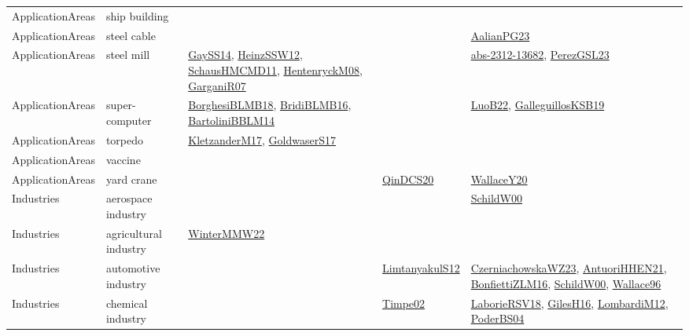{\begin{longtable}{lp{3cm}>{\raggedright}p{6cm}>{\raggedright}p{6cm}p{8cm}}
ApplicationAreas & ship building &  &  & \\
ApplicationAreas & steel cable &  &  & \href{papers/AalianPG23.pdf}{AalianPG23}\cite{AalianPG23}\\
ApplicationAreas & steel mill & \href{papers/GaySS14.pdf}{GaySS14}\cite{GaySS14}, \href{articles/HeinzSSW12.pdf}{HeinzSSW12}\cite{HeinzSSW12}, \href{articles/SchausHMCMD11.pdf}{SchausHMCMD11}\cite{SchausHMCMD11}, \href{papers/HentenryckM08.pdf}{HentenryckM08}\cite{HentenryckM08}, \href{papers/GarganiR07.pdf}{GarganiR07}\cite{GarganiR07} &  & \href{articles/abs-2312-13682.pdf}{abs-2312-13682}\cite{abs-2312-13682}, \href{papers/PerezGSL23.pdf}{PerezGSL23}\cite{PerezGSL23}\\
ApplicationAreas & super-computer & \href{articles/BorghesiBLMB18.pdf}{BorghesiBLMB18}\cite{BorghesiBLMB18}, \href{articles/BridiBLMB16.pdf}{BridiBLMB16}\cite{BridiBLMB16}, \href{papers/BartoliniBBLM14.pdf}{BartoliniBBLM14}\cite{BartoliniBBLM14} &  & \href{papers/LuoB22.pdf}{LuoB22}\cite{LuoB22}, \href{papers/GalleguillosKSB19.pdf}{GalleguillosKSB19}\cite{GalleguillosKSB19}\\
ApplicationAreas & torpedo & \href{papers/KletzanderM17.pdf}{KletzanderM17}\cite{KletzanderM17}, \href{papers/GoldwaserS17.pdf}{GoldwaserS17}\cite{GoldwaserS17} &  & \\
ApplicationAreas & vaccine &  &  & \\
ApplicationAreas & yard crane &  & \href{articles/QinDCS20.pdf}{QinDCS20}\cite{QinDCS20} & \href{articles/WallaceY20.pdf}{WallaceY20}\cite{WallaceY20}\\
Industries & aerospace industry &  &  & \href{articles/SchildW00.pdf}{SchildW00}\cite{SchildW00}\\
Industries & agricultural industry & \href{papers/WinterMMW22.pdf}{WinterMMW22}\cite{WinterMMW22} &  & \\
Industries & automotive industry &  & \href{articles/LimtanyakulS12.pdf}{LimtanyakulS12}\cite{LimtanyakulS12} & \href{articles/CzerniachowskaWZ23.pdf}{CzerniachowskaWZ23}\cite{CzerniachowskaWZ23}, \href{papers/AntuoriHHEN21.pdf}{AntuoriHHEN21}\cite{AntuoriHHEN21}, \href{papers/BonfiettiZLM16.pdf}{BonfiettiZLM16}\cite{BonfiettiZLM16}, \href{articles/SchildW00.pdf}{SchildW00}\cite{SchildW00}, \href{articles/Wallace96.pdf}{Wallace96}\cite{Wallace96}\\
Industries & chemical industry &  & \href{articles/Timpe02.pdf}{Timpe02}\cite{Timpe02} & \href{articles/LaborieRSV18.pdf}{LaborieRSV18}\cite{LaborieRSV18}, \href{papers/GilesH16.pdf}{GilesH16}\cite{GilesH16}, \href{articles/LombardiM12.pdf}{LombardiM12}\cite{LombardiM12}, \href{articles/PoderBS04.pdf}{PoderBS04}\cite{PoderBS04}\\

\end{longtable}}
